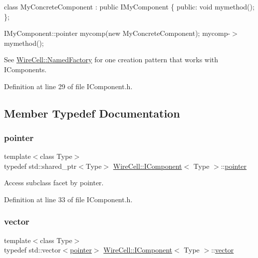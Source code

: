 class My\+Concrete\+Component \+: public I\+My\+Component \{ public\+: void mymethod(); \};

I\+My\+Component\+::pointer mycomp(new My\+Concrete\+Component); mycomp-\/$>$mymethod();

See \hyperlink{class_wire_cell_1_1_named_factory}{Wire\+Cell\+::\+Named\+Factory} for one creation pattern that works with I\+Components. 

Definition at line 29 of file I\+Component.\+h.



\subsection{Member Typedef Documentation}
\mbox{\label{class_wire_cell_1_1_i_component_a744b962ee9489c909f1b0f1fe2533798}} 
\subsubsection{\texorpdfstring{pointer}{pointer}}
{\footnotesize\ttfamily template$<$class Type$>$ \\
typedef std\+::shared\+\_\+ptr$<$Type$>$ \hyperlink{class_wire_cell_1_1_i_component}{Wire\+Cell\+::\+I\+Component}$<$ Type $>$\+::\hyperlink{class_wire_cell_1_1_i_component_a744b962ee9489c909f1b0f1fe2533798}{pointer}}



Access subclass facet by pointer. 



Definition at line 33 of file I\+Component.\+h.

\mbox{\label{class_wire_cell_1_1_i_component_a18978d88ce697af5941655a89660fd4e}} 
\subsubsection{\texorpdfstring{vector}{vector}}
{\footnotesize\ttfamily template$<$class Type$>$ \\
typedef std\+::vector$<$\hyperlink{class_wire_cell_1_1_i_component_a744b962ee9489c909f1b0f1fe2533798}{pointer}$>$ \hyperlink{class_wire_cell_1_1_i_component}{Wire\+Cell\+::\+I\+Component}$<$ Type $>$\+::\hyperlink{class_wire_cell_1_1_i_component_a18978d88ce697af5941655a89660fd4e}{vector}}



